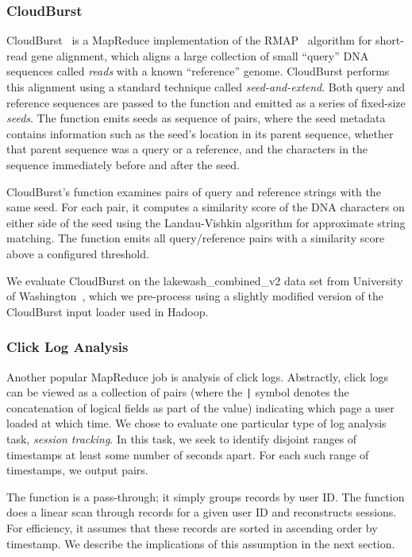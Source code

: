 \subsubsection{CloudBurst}

CloudBurst~\cite{cloudburst-bio} is a MapReduce
implementation of the RMAP~\cite{rmap} algorithm for short-read gene alignment,
which aligns a large collection of small ``query'' DNA sequences called
\emph{reads} with a known ``reference'' genome. CloudBurst performs this
alignment using a standard technique called \emph{seed-and-extend}. Both query
and reference sequences are passed to the \map function and emitted as a series
of fixed-size \emph{seeds}. The \map function emits seeds as sequence of
 pairs, where the seed metadata contains
information such as the seed's location in its parent sequence, whether that
parent sequence was a query or a reference, and the characters in the sequence
immediately before and after the seed.

CloudBurst's \reduce function examines pairs of query and reference strings with
the same seed. For each pair, it computes a similarity score of the DNA
characters on either side of the seed using the Landau-Vishkin algorithm for
approximate string matching. The \reduce function emits all query/reference
pairs with a similarity score above a configured threshold.

We evaluate CloudBurst on the lakewash\_combined\_v2 data set from University
of Washington~\cite{cloudburst_uw_data}, which we pre-process using a slightly
modified version of the CloudBurst input loader used in Hadoop.

\subsubsection{Click Log Analysis}

Another popular MapReduce job is analysis of click logs. Abstractly, click logs
can be viewed as a collection of  pairs (where
the \texttt{|} symbol denotes the concatenation of logical fields as part of
the value) indicating which page a user loaded at which time.  We chose to
evaluate one particular type of log analysis task, \emph{session tracking}. In
this task, we seek to identify disjoint ranges of timestamps at least some
number of seconds apart. For each such range of timestamps, we output
 pairs.

The \map function is a pass-through; it simply groups records by user ID. The
\reduce function does a linear scan through records for a given user ID and
reconstructs sessions. For efficiency, it assumes that these records are sorted
in ascending order by timestamp. We describe the implications of this
assumption in the next section.

